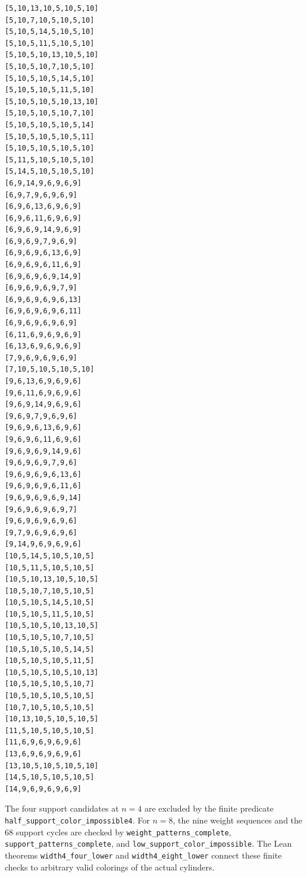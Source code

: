 \begin{verbatim}
[5,10,13,10,5,10,5,10]
[5,10,7,10,5,10,5,10]
[5,10,5,14,5,10,5,10]
[5,10,5,11,5,10,5,10]
[5,10,5,10,13,10,5,10]
[5,10,5,10,7,10,5,10]
[5,10,5,10,5,14,5,10]
[5,10,5,10,5,11,5,10]
[5,10,5,10,5,10,13,10]
[5,10,5,10,5,10,7,10]
[5,10,5,10,5,10,5,14]
[5,10,5,10,5,10,5,11]
[5,10,5,10,5,10,5,10]
[5,11,5,10,5,10,5,10]
[5,14,5,10,5,10,5,10]
[6,9,14,9,6,9,6,9]
[6,9,7,9,6,9,6,9]
[6,9,6,13,6,9,6,9]
[6,9,6,11,6,9,6,9]
[6,9,6,9,14,9,6,9]
[6,9,6,9,7,9,6,9]
[6,9,6,9,6,13,6,9]
[6,9,6,9,6,11,6,9]
[6,9,6,9,6,9,14,9]
[6,9,6,9,6,9,7,9]
[6,9,6,9,6,9,6,13]
[6,9,6,9,6,9,6,11]
[6,9,6,9,6,9,6,9]
[6,11,6,9,6,9,6,9]
[6,13,6,9,6,9,6,9]
[7,9,6,9,6,9,6,9]
[7,10,5,10,5,10,5,10]
[9,6,13,6,9,6,9,6]
[9,6,11,6,9,6,9,6]
[9,6,9,14,9,6,9,6]
[9,6,9,7,9,6,9,6]
[9,6,9,6,13,6,9,6]
[9,6,9,6,11,6,9,6]
[9,6,9,6,9,14,9,6]
[9,6,9,6,9,7,9,6]
[9,6,9,6,9,6,13,6]
[9,6,9,6,9,6,11,6]
[9,6,9,6,9,6,9,14]
[9,6,9,6,9,6,9,7]
[9,6,9,6,9,6,9,6]
[9,7,9,6,9,6,9,6]
[9,14,9,6,9,6,9,6]
[10,5,14,5,10,5,10,5]
[10,5,11,5,10,5,10,5]
[10,5,10,13,10,5,10,5]
[10,5,10,7,10,5,10,5]
[10,5,10,5,14,5,10,5]
[10,5,10,5,11,5,10,5]
[10,5,10,5,10,13,10,5]
[10,5,10,5,10,7,10,5]
[10,5,10,5,10,5,14,5]
[10,5,10,5,10,5,11,5]
[10,5,10,5,10,5,10,13]
[10,5,10,5,10,5,10,7]
[10,5,10,5,10,5,10,5]
[10,7,10,5,10,5,10,5]
[10,13,10,5,10,5,10,5]
[11,5,10,5,10,5,10,5]
[11,6,9,6,9,6,9,6]
[13,6,9,6,9,6,9,6]
[13,10,5,10,5,10,5,10]
[14,5,10,5,10,5,10,5]
[14,9,6,9,6,9,6,9]
\end{verbatim}

The four support candidates at $n=4$ are excluded by the finite predicate
\texttt{half\_support\_color\_impossible4}. For $n=8$, the nine weight
sequences and the 68 support cycles are checked by
\texttt{weight\_patterns\_complete}, \texttt{support\_patterns\_complete},
and \texttt{low\_support\_color\_impossible}. The Lean theorems
\texttt{width4\_four\_lower} and \texttt{width4\_eight\_lower} connect
these finite checks to arbitrary valid colorings of the actual cylinders.
